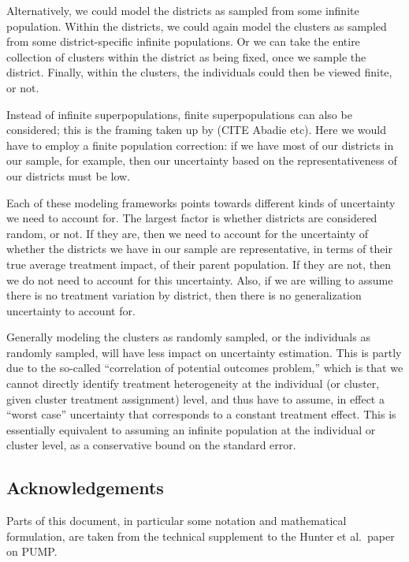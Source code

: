 \documentclass[12pt]{article}
\begin{document}
Alternatively, we could model the districts as sampled from some infinite population.
Within the districts, we could again model the clusters as sampled from some district-specific infinite populations.
Or we can take the entire collection of clusters within the district as being fixed, once we sample the district.
Finally, within the clusters, the individuals could then be viewed finite, or not.

Instead of infinite superpopulations, finite superpopulations can also be considered; this is the framing taken up by (CITE Abadie etc).
Here we would have to employ a finite population correction: if we have most of our districts in our sample, for example, then our uncertainty based on the representativeness of our districts must be low.


Each of these modeling frameworks points towards different kinds of uncertainty we need to account for.
The largest factor is whether districts are considered random, or not.
If they are, then we need to account for the uncertainty of whether the districts we have in our sample are representative, in terms of their true average treatment impact, of their parent population.
If they are not, then we do not need to account for this uncertainty.
Also, if we are willing to assume there is no treatment variation by district, then there is no generalization uncertainty to account for.

Generally modeling the clusters as randomly sampled, or the individuals as randomly sampled, will have less impact on uncertainty estimation.
This is partly due to the so-called ``correlation of potential outcomes problem,'' which is that we cannot directly identify treatment heterogeneity at the individual (or cluster, given cluster treatment assignment) level, and thus have to assume, in effect a ``worst case'' uncertainty that corresponds to a constant treatment effect.
This is essentially equivalent to assuming an infinite population at the individual or cluster level, as a conservative bound on the standard error. 



\subsection{Acknowledgements}\label{acknowledgements}

Parts of this document, in particular some notation and mathematical
formulation, are taken from the technical supplement to the Hunter et
al.~paper on PUMP.
\end{document}
